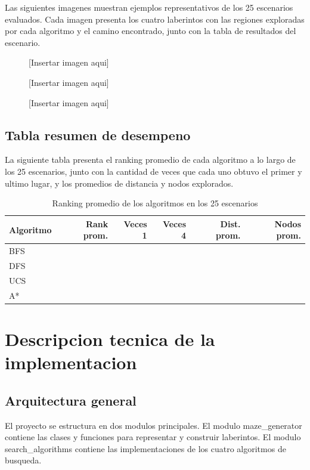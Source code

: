 \documentclass[12pt]{article}
\newcommand{\imgplaceholder}[2]{%
  \begin{figure}[H]
    \centering
    \fbox{\rule{0pt}{#2}\rule{#1}{0pt}}
    \caption{[Insertar imagen aqui]}
  \end{figure}%
}
\begin{document}
Las siguientes imagenes muestran ejemplos representativos de los 25 escenarios evaluados. Cada imagen presenta los cuatro laberintos con las regiones exploradas por cada algoritmo y el camino encontrado, junto con la tabla de resultados del escenario.

\imgplaceholder{0.9\textwidth}{7cm}

\imgplaceholder{0.9\textwidth}{7cm}

\imgplaceholder{0.9\textwidth}{7cm}

\subsection{Tabla resumen de desempeno}

La siguiente tabla presenta el ranking promedio de cada algoritmo a lo largo de los 25 escenarios, junto con la cantidad de veces que cada uno obtuvo el primer y ultimo lugar, y los promedios de distancia y nodos explorados.

\vspace{8pt}
\begin{table}[H]
\centering
\begin{tabular}{lrrrrr}
\toprule
Algoritmo & Rank prom. & Veces 1 & Veces 4 & Dist. prom. & Nodos prom. \\
\midrule
BFS      & & & & & \\
DFS      & & & & & \\
UCS      & & & & & \\
A*       & & & & & \\
\bottomrule
\end{tabular}
\caption{Ranking promedio de los algoritmos en los 25 escenarios}
\end{table}

\section{Descripcion tecnica de la implementacion}

\subsection{Arquitectura general}

El proyecto se estructura en dos modulos principales. El modulo maze\_generator contiene las clases y funciones para representar y construir laberintos. El modulo search\_algorithms contiene las implementaciones de los cuatro algoritmos de busqueda.
\end{document}
